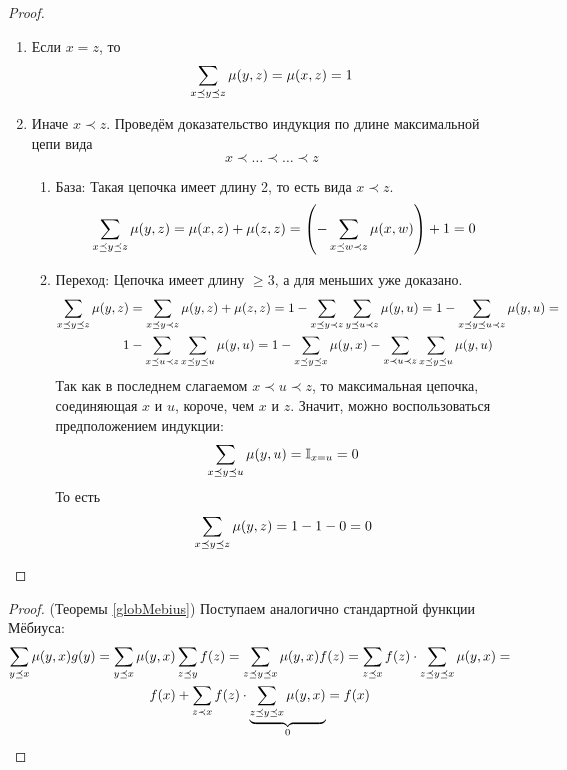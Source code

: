 \begin{proof}~
	\begin{enumerate}
		\item Если $x = z$, то
		\[
			\sum\limits_{x \preceq y \preceq z} \mu(y, z) = \mu(x, z) = 1
		\]
		
		\item Иначе $x \prec z$. Проведём доказательство индукция по длине максимальной цепи вида
		\[
			x \prec \ldots \prec \ldots \prec z
		\]
		\begin{enumerate}
			\item База: Такая цепочка имеет длину 2, то есть вида $x \prec z$.
			\[
				\sum\limits_{x \preceq y \preceq z} \mu(y, z) = \mu(x, z) + \mu(z, z) = \left(-\sum\limits_{x \preceq w \prec z} \mu(x, w)\right) + 1 = 0
			\]
			
			\item Переход: Цепочка имеет длину $\ge 3$, а для меньших уже доказано.
			\begin{multline*}
				\sum\limits_{x \preceq y \preceq z} \mu(y, z) = \sum\limits_{x \preceq y \prec z} \mu(y, z) + \mu(z, z) = 1 - \sum\limits_{x \preceq y \prec z} \sum\limits_{y \preceq u \prec z} \mu(y, u) = 1 - \sum\limits_{x \preceq y \preceq u \prec z} \mu(y, u) =
				\\
				1 - \sum\limits_{x \preceq u \prec z} \sum\limits_{x \preceq y \preceq u} \mu(y, u) = 1 - \sum\limits_{x \preceq y \preceq x} \mu(y, x) - \sum\limits_{x \prec u \prec z} \sum\limits_{x \preceq y \preceq u} \mu(y, u)
			\end{multline*}
			Так как в последнем слагаемом $x \prec u \prec z$, то максимальная цепочка, соединяющая $x$ и $u$, короче, чем $x$ и $z$. Значит, можно воспользоваться предположением индукции:
			\[
				\sum\limits_{x \preceq y \preceq u} \mu(y, u) = \mathbb{I}_{x = u} = 0
			\]
			То есть
			\[
				\sum\limits_{x \preceq y \preceq z} \mu(y, z) = 1 - 1 - 0 = 0
			\]
		\end{enumerate}
	\end{enumerate}
\end{proof}

\begin{proof} (Теоремы \ref{globMebius})
	Поступаем аналогично стандартной функции Мёбиуса:
	\begin{multline*}
		\sum\limits_{y \preceq x} \mu(y, x) g(y) = \sum\limits_{y \preceq x} \mu(y, x) \sum\limits_{z \preceq y} f(z) = \sum\limits_{z \preceq y \preceq x} \mu(y, x)f(z) = \sum\limits_{z \preceq x} f(z) \cdot \sum\limits_{z \preceq y \preceq x} \mu(y, x) =
		\\
		f(x) + \sum\limits_{z \prec x}f(z) \cdot  \underbrace{\sum\limits_{z \preceq y \preceq x} \mu(y, x)}_0 = f(x)
	\end{multline*}
\end{proof}